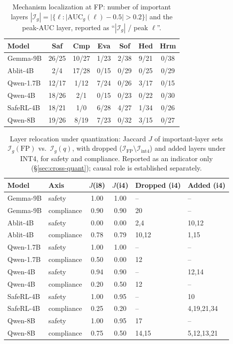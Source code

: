 \documentclass[10pt,twocolumn]{article}
\newcommand{\AUC}{\mathrm{AUC}}
\begin{document}
\begin{table}[p]
\centering\footnotesize
\setlength{\tabcolsep}{4pt}
\caption{Mechanism localization at FP: number of important layers
$|\mathcal{I}_g|=|\{\ell:|\AUC_g(\ell)-0.5|>0.2\}|$ and the peak-$\AUC$ layer, reported as
``$|\mathcal{I}_g|$ / peak $\ell$''.}
\label{tab:important-layers}
\begin{tabular}{@{}lcccccc@{}}
\toprule
Model & Saf & Cmp & Eva & Sof & Hed & Hrm \\
\midrule
Gemma-9B  & 26/25 & 10/27 & 1/23 & 2/38 & 9/21 & 0/38 \\
Ablit-4B  &  2/4  & 17/28 & 0/15 & 0/29 & 0/25 & 0/29 \\
Qwen-1.7B & 12/17 &  1/12 & 7/24 & 0/26 & 3/17 & 0/15 \\
Qwen-4B   & 18/26 &  2/1  & 0/15 & 0/23 & 0/22 & 0/30 \\
SafeRL-4B & 18/21 &  1/0  & 6/28 & 4/27 & 1/34 & 0/26 \\
Qwen-8B   & 19/26 &  8/19 & 7/23 & 0/32 & 3/15 & 0/27 \\
\bottomrule
\end{tabular}
\end{table}

\begin{table}[p]
\centering\footnotesize
\setlength{\tabcolsep}{3.5pt}
\caption{Layer relocation under quantization: Jaccard $J$ of important-layer sets
$\mathcal{I}_g(\mathrm{FP})$ vs.\ $\mathcal{I}_g(q)$, with dropped
($\mathcal{I}_{\mathrm{FP}}\!\setminus\!\mathcal{I}_{\mathrm{int4}}$) and added layers under
INT4, for safety and compliance. Reported as an indicator only (\S\ref{sec:cross-quant});
causal role is established separately.}
\label{tab:relocation}
\begin{tabular}{@{}llccll@{}}
\toprule
Model & Axis & $J$(i8) & $J$(i4) & Dropped (i4) & Added (i4) \\
\midrule
Gemma-9B  & safety     & 1.00 & 1.00 & --      & --        \\
Gemma-9B  & compliance & 0.90 & 0.90 & 20      & --        \\
Ablit-4B  & safety     & 0.00 & 0.00 & 2,4     & 10,12     \\
Ablit-4B  & compliance & 0.78 & 0.79 & 10,12   & 1,15      \\
Qwen-1.7B & safety     & 1.00 & 1.00 & --      & --        \\
Qwen-1.7B & compliance & 0.50 & 0.00 & 12      & --        \\
Qwen-4B   & safety     & 0.94 & 0.90 & --      & 12,14     \\
Qwen-4B   & compliance & 0.20 & 0.50 & 12      & --        \\
SafeRL-4B & safety     & 1.00 & 0.95 & --      & 10        \\
SafeRL-4B & compliance & 0.25 & 0.20 & --      & 4,19,21,34 \\
Qwen-8B   & safety     & 1.00 & 0.95 & 17      & --        \\
Qwen-8B   & compliance & 0.75 & 0.50 & 14,15   & 5,12,13,21 \\
\bottomrule
\end{tabular}
\end{table}
\end{document}
